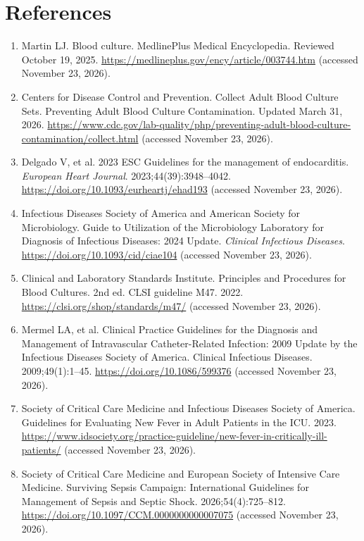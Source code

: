 \section*{References}
\begin{enumerate}
  \item Martin LJ. Blood culture. MedlinePlus Medical Encyclopedia. Reviewed October 19, 2025. \url{https://medlineplus.gov/ency/article/003744.htm} (accessed November 23, 2026).
  \item Centers for Disease Control and Prevention. Collect Adult Blood Culture Sets. Preventing Adult Blood Culture Contamination. Updated March 31, 2026. \url{https://www.cdc.gov/lab-quality/php/preventing-adult-blood-culture-contamination/collect.html} (accessed November 23, 2026).
  \item Delgado V, et al. 2023 ESC Guidelines for the management of endocarditis. \textit{European Heart Journal}. 2023;44(39):3948--4042. \url{https://doi.org/10.1093/eurheartj/ehad193} (accessed November 23, 2026).
  \item Infectious Diseases Society of America and American Society for Microbiology. Guide to Utilization of the Microbiology Laboratory for Diagnosis of Infectious Diseases: 2024 Update. \textit{Clinical Infectious Diseases}. \url{https://doi.org/10.1093/cid/ciae104} (accessed November 23, 2026).
  \item Clinical and Laboratory Standards Institute. Principles and Procedures for Blood Cultures. 2nd ed. CLSI guideline M47. 2022. \url{https://clsi.org/shop/standards/m47/} (accessed November 23, 2026).
  \item Mermel LA, et al. Clinical Practice Guidelines for the Diagnosis and Management of Intravascular Catheter-Related Infection: 2009 Update by the Infectious Diseases Society of America. Clinical Infectious Diseases. 2009;49(1):1--45. \url{https://doi.org/10.1086/599376} (accessed November 23, 2026).
  \item Society of Critical Care Medicine and Infectious Diseases Society of America. Guidelines for Evaluating New Fever in Adult Patients in the ICU. 2023. \url{https://www.idsociety.org/practice-guideline/new-fever-in-critically-ill-patients/} (accessed November 23, 2026).
  \item Society of Critical Care Medicine and European Society of Intensive Care Medicine. Surviving Sepsis Campaign: International Guidelines for Management of Sepsis and Septic Shock. 2026;54(4):725--812. \url{https://doi.org/10.1097/CCM.0000000000007075} (accessed November 23, 2026).
\end{enumerate}

\clearpage
